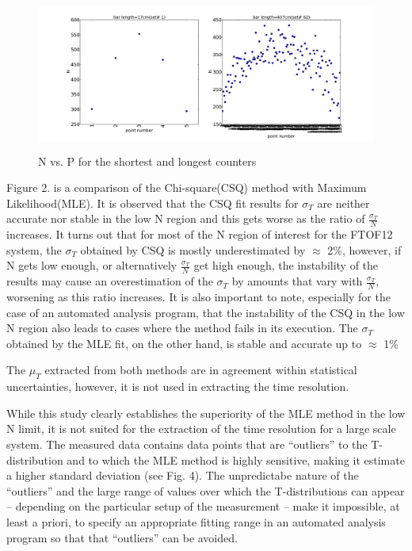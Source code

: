 \documentclass[12pt]{article}
\begin{document}
\begin{figure}[ht]
	\includegraphics[height=2in,width=5in]{bar_stats_write-up_N-vs-p.pdf}
	\caption{N vs. P for the shortest and longest counters}
	\label{fig1}
\end{figure}

Figure 2. is a comparison of the Chi-square(CSQ) method with Maximum Likelihood(MLE). It is observed that the CSQ fit results for $\sigma_{T}$ are neither accurate nor stable in the low N region and this gets worse as the ratio of $\frac{\sigma_{T}}{N}$ increases. It turns out that for most of the N region of interest for the FTOF12 system, the $\sigma_{T}$ obtained by CSQ is mostly underestimated by $\approx$ 2\%, however, if N gets low enough, or alternatively $\frac{\sigma_{T}}{N}$ get high enough, the instability of the results may cause an overestimation of the $\sigma_{T}$ by amounts that vary with $\frac{\sigma_{T}}{N}$, worsening as this ratio increases. It is also important to note, especially for the case of an automated analysis program, that the instability of the CSQ in the low N region also leads to cases where the method fails in its execution. The $\sigma_{T}$ obtained by the MLE fit, on the other hand, is stable and accurate up to $\approx$ 1\%

The $\mu_{T}$ extracted from both methods are in agreement within statistical uncertainties, however, it is not used in extracting the time resolution.

While this study clearly establishes the superiority of the MLE method in the low N limit, it is not suited for the extraction of the time resolution for a large scale system. The measured data contains data points that are ``outliers'' to the T-distribution and to which the MLE method is highly sensitive, making it estimate a higher standard deviation (see Fig. 4). The unpredictabe nature of the ``outliers'' and the large range of values over which the T-distributions can appear -- depending on the particular setup of the measurement -- make it impossible, at least a priori, to specify an appropriate fitting range in an automated analysis program so that that ``outliers'' can be avoided. 
\end{document}
